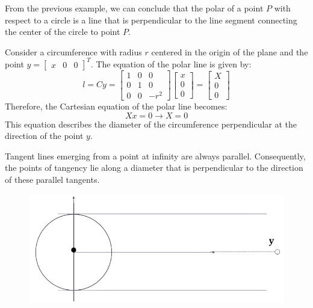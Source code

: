 \documentclass[12pt, a4paper]{report}
\begin{document}
    From the previous example, we can conclude that the polar of a point $P$ with respect to a circle is a line that is perpendicular to the line segment connecting the center of the circle to point $P$. 
    \begin{example}
        Consider a circumference with radius $r$ centered in the origin of the plane and the point $y={\begin{bmatrix} x & 0 & 0 \end{bmatrix}}^T$.
        The equation of the polar line is given by:
        \[
        l=Cy=
        \begin{bmatrix}
            1 & 0 & 0 \\
            0 & 1 & 0 \\
            0 & 0 & -r^2
        \end{bmatrix}    
        \begin{bmatrix}
            x \\
            0 \\
            0 
        \end{bmatrix}    
        = 
        \begin{bmatrix}
            X \\
            0 \\
            0 
        \end{bmatrix}  
        \]
        Therefore, the Cartesian equation of the polar line becomes: 
        \[X x=0 \rightarrow X=0\]
        This equation describes the diameter of the circumference perpendicular at the direction of the point $y$. 
    \end{example}
    Tangent lines emerging from a point at infinity are always parallel. 
    Consequently, the points of tangency lie along a diameter that is perpendicular to the direction of these parallel tangents.    
    \begin{figure}[H]
        \centering
        \includegraphics[width=0.5\linewidth]{images/parallel.png}
    \end{figure}
\end{document}
